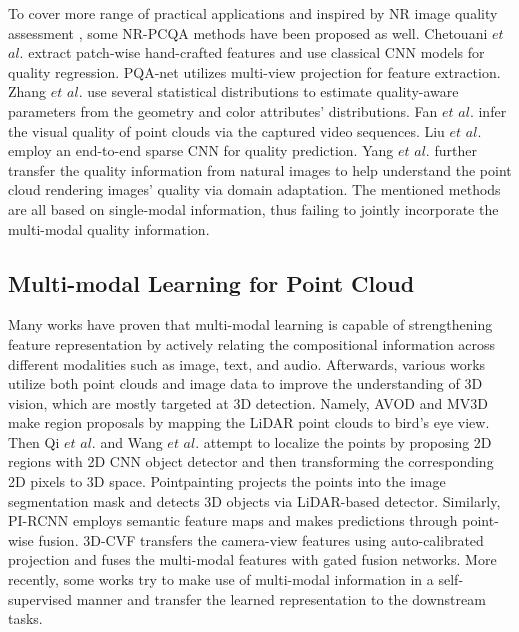 \documentclass{article}
\begin{document}
To cover more range of practical applications and inspired by NR image quality assessment \cite{zhang2022nor,zhang2022dual,zhang2021ano}, some NR-PCQA methods have been proposed as well.  Chetouani $et$  $al.$ \cite{chetouani2021deep} extract patch-wise hand-crafted features and use classical CNN models for quality regression. PQA-net \cite{liu2021pqa} utilizes multi-view projection for feature extraction. Zhang $et$  $al.$ \cite{zhang2021no} use several statistical distributions to estimate quality-aware parameters from the geometry and color attributes' distributions. Fan $et$  $al.$ \cite{fan2022no} infer the visual quality of point clouds via the captured video sequences. Liu $et$  $al.$ \cite{liu2022point} employ an end-to-end sparse CNN for quality prediction. Yang $et$  $al.$ \cite{yang2022no} further transfer the quality information from natural images to help understand the point cloud rendering images' quality via domain adaptation. The mentioned methods are all based on single-modal information, thus failing to jointly incorporate the multi-modal quality information.



\subsection{Multi-modal Learning for Point Cloud}
Many works \cite{radford2021learning,cheng2020look} have proven that multi-modal learning is capable of strengthening feature representation by actively relating the compositional information across different modalities such as image, text, and audio. Afterwards, various works utilize both point clouds and image data to improve the understanding of 3D vision, which are mostly targeted at 3D detection. Namely, AVOD \cite{ku2018joint} and MV3D \cite{chen2020object} make region proposals by mapping the LiDAR point clouds to bird's eye view. Then Qi $et$  $al.$ \cite{qi2018frustum} and Wang $et$  $al.$ \cite{wang2019frustum} attempt to localize the points by proposing 2D regions with 2D CNN object detector and then transforming the corresponding 2D pixels to 3D space.  Pointpainting \cite{vora2020pointpainting} projects the points into the image segmentation mask and detects 3D objects via LiDAR-based detector. Similarly, PI-RCNN \cite{xie2020pi} employs semantic feature maps and makes predictions through point-wise fusion. 3D-CVF  \cite{yoo20203d} transfers the camera-view features using auto-calibrated projection and fuses the multi-modal features with gated fusion networks. More recently, some works \cite{afham2022crosspoint,zhang2022cat} try to make use of multi-modal information in a self-supervised manner and transfer the learned representation to the downstream tasks.
\end{document}
